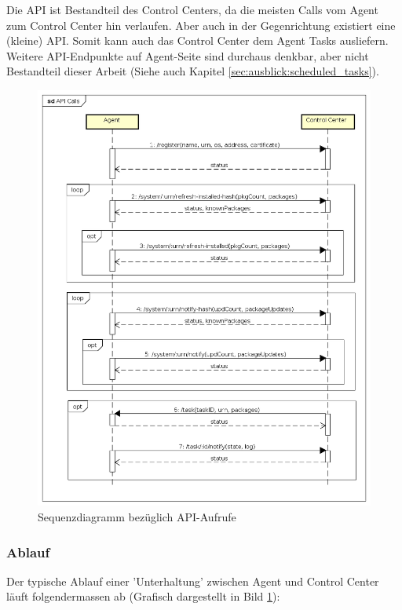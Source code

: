 Die API ist Bestandteil des Control Centers, da die meisten Calls vom Agent zum Control Center hin verlaufen. Aber auch in der Gegenrichtung existiert eine (kleine) API. Somit kann auch das Control Center dem Agent Tasks ausliefern. Weitere API-Endpunkte auf Agent-Seite sind durchaus denkbar, aber nicht Bestandteil dieser Arbeit (Siehe auch Kapitel \ref{sec:ausblick:scheduled_tasks}).

\clearpage
\begin{figure}
  \centering
    \includegraphics[width=\textwidth]{files/API_Calls}
  \caption{Sequenzdiagramm bezüglich API-Aufrufe}
  \label{fig:api_sequence_diagram}
\end{figure}

\subsubsection*{Ablauf}

Der typische Ablauf einer 'Unterhaltung' zwischen Agent und Control Center läuft folgendermassen ab (Grafisch dargestellt in Bild \ref{fig:api_sequence_diagram}):

